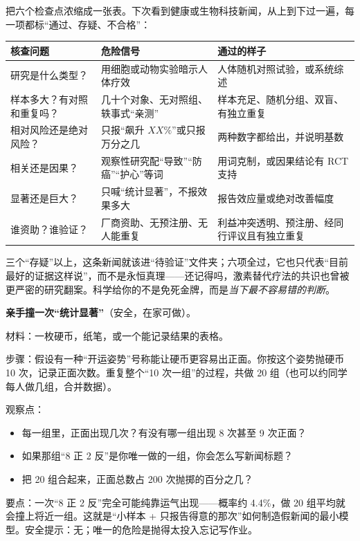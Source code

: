 把六个检查点浓缩成一张表。下次看到健康或生物科技新闻，从上到下过一遍，每一项都标“通过、存疑、不合格”：

\begin{table}[htbp]
\centering
\begin{tabular}{p{}p{}p{}}
\toprule
\textbf{核查问题} & \textbf{危险信号} & \textbf{通过的样子} \\
\midrule
研究是什么类型？ & 用细胞或动物实验暗示人体疗效 & 人体随机对照试验，或系统综述 \\
样本多大？有对照和重复吗？ & 几十个对象、无对照组、轶事式“亲测” & 样本充足、随机分组、双盲、有独立重复 \\
相对风险还是绝对风险？ & 只报“飙升 $XX\%$”或只报万分之几 & 两种数字都给出，并说明基数 \\
相关还是因果？ & 观察性研究配“导致”“防癌”“护心”等词 & 用词克制，或因果结论有 RCT 支持 \\
显著还是巨大？ & 只喊“统计显著”，不报效果多大 & 报告效应量或绝对改善幅度 \\
谁资助？谁验证？ & 厂商资助、无预注册、无人能重复 & 利益冲突透明、预注册、经同行评议且有独立重复 \\
\bottomrule
\end{tabular}
\end{table}

三个“存疑”以上，这条新闻就该进“待验证”文件夹；六项全过，它也只代表“目前最好的证据这样说”，而不是永恒真理——还记得吗，激素替代疗法的共识也曾被更严密的研究翻案。科学给你的不是免死金牌，而是\emph{当下最不容易错的判断}。

\begin{shiyan}
\textbf{亲手撞一次“统计显著”}（安全，在家可做）。

材料：一枚硬币，纸笔，或一个能记录结果的表格。

步骤：假设有一种“开运姿势”号称能让硬币更容易出正面。你按这个姿势抛硬币 10 次，记录正面次数。重复整个“10 次一组”的过程，共做 20 组（也可以约同学每人做几组，合并数据）。

观察点：
\begin{itemize}[itemsep=1pt]
\item 每一组里，正面出现几次？有没有哪一组出现 8 次甚至 9 次正面？
\item 如果那组“8 正 2 反”是你唯一做的一组，你会怎么写新闻标题？
\item 把 20 组合起来，正面总数占 200 次抛掷的百分之几？
\end{itemize}

要点：一次“8 正 2 反”完全可能纯靠运气出现——概率约 4.4\%，做 20 组平均就会撞上将近一组。这就是“小样本 + 只报告得意的那次”如何制造假新闻的最小模型。安全提示：无；唯一的危险是抛得太投入忘记写作业。
\end{shiyan}

